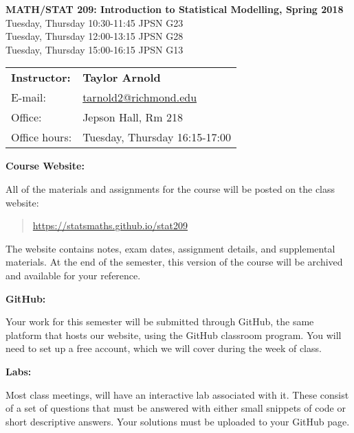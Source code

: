 \documentclass[12pt]{article}
\begin{document}
\begin{center}
{\bf MATH/STAT 209: Introduction to Statistical Modelling, Spring 2018} \\
Tuesday, Thursday 10:30-11:45 \quad JPSN G23\\
Tuesday, Thursday 12:00-13:15 \quad JPSN G28\\
Tuesday, Thursday 15:00-16:15 \quad JPSN G13
\end{center}

\bigskip

\noindent
\begin{tabular}{ l l }
{\bf Instructor:} &  {\bf Taylor Arnold} \\
E-mail: & \href{mailto:tarnold2@richmond.edu}{tarnold2@richmond.edu} \\
Office: & Jepson Hall, Rm 218 \\
Office hours: & Tuesday, Thursday 16:15-17:00
\end{tabular}

\vspace{0.5cm}

\textbf{Course Website:} \vspace{6pt}

All of the materials and assignments for the course will be posted
on the class website:
\begin{quote}
\url{https://statsmaths.github.io/stat209}
\end{quote}
The website contains notes, exam dates, assignment details, and
supplemental materials. At the end of the semester, this version of
the course will be archived and available for your reference.

\vspace{0.4cm}

\textbf{GitHub:} \vspace{6pt}

Your work for this semester will be submitted through GitHub,
the same platform that hosts our website, using the GitHub
classroom program. You will need to set up a free account, which
we will cover during the week of class.

\vspace{0.4cm}

\textbf{Labs:} \vspace{6pt}

Most class meetings, will have an interactive lab associated with
it. These consist of a set of questions that must be answered with
either small snippets of code or short descriptive answers. Your
solutions must be uploaded to your GitHub page.
\end{document}
